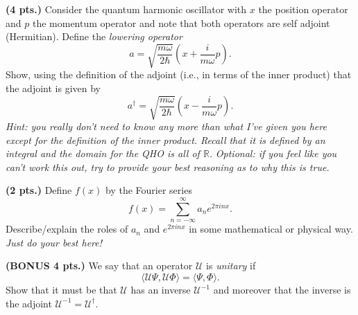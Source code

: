 \documentclass[12pt]{amsbook}
\newcommand{\R}{\mathbb{R}}
\newcommand{\innprod}[2]{\langle #1, #2 \rangle}
\begin{document}
\begin{problem}
\textbf{(4 pts.)} Consider the quantum harmonic oscillator with $x$ the position operator and $p$ the momentum operator and note that both operators are self adjoint (Hermitian). Define the \emph{lowering operator}
\[
a = \sqrt{\frac{m\omega}{2\hbar}} \left(x+\frac{i}{m\omega} p\right).
\]
Show, using the definition of the adjoint (i.e., in terms of the inner product) that the adjoint is given by
\[
a^\dagger = \sqrt{\frac{m\omega}{2\hbar}} \left(x-\frac{i}{m\omega} p\right).
\]
\emph{Hint: you really don't need to know any more than what I've given you here except for the definition of the inner product. Recall that it is defined by an integral and the domain for the QHO is all of $\R$.} \emph{Optional: if you feel like you can't work this out, try to provide your best reasoning as to why this is true.}
\end{problem}

\begin{problem}
\textbf{(2 pts.)} Define $f(x)$ by the Fourier series
\[
f(x) = \sum_{n=-\infty}^\infty a_n e^{2\pi i n x}.
\]
Describe/explain the roles of $a_n$ and $e^{2\pi i n x}$ in some mathematical or physical way. \emph{Just do your best here!}
\end{problem}


\begin{problem}
\textbf{(BONUS 4 pts.)} We say that an operator $\mathcal{U}$ is \emph{unitary} if
\[
\innprod{\mathcal{U}\Psi}{\mathcal{U}\Phi}= \innprod{\Psi}{\Phi}.
\]
Show that it must be that $\mathcal{U}$ has an inverse $\mathcal{U}^{-1}$ and moreover that the inverse is the adjoint  $\mathcal{U}^{-1} = \mathcal{U}^\dagger$.
\end{problem}
\end{document}
